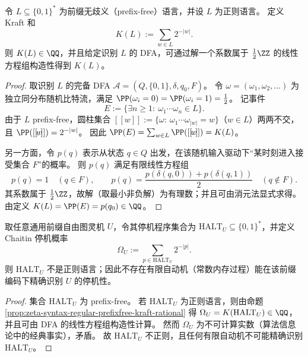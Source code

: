 \begin{proposition}\label{prop:zeta-syntax-regular-prefixfree-kraft-rational}
令 \(L\subseteq\{0,1\}^\ast\) 为前缀无歧义（prefix-free）语言，并设 \(L\) 为正则语言。
定义 Kraft 和
\[
K(L):=\sum_{w\in L}2^{-|w|}.
\]
则 \(K(L)\in\QQ\)，并且给定识别 \(L\) 的 DFA，可通过解一个系数属于 \(\tfrac12\ZZ\) 的线性方程组构造性得到 \(K(L)\)。
\end{proposition}
\begin{proof}
取识别 \(L\) 的完备 DFA \(\mathcal A=(Q,\{0,1\},\delta,q_0,F)\)。
令 \(\omega=(\omega_1,\omega_2,\dots)\) 为独立同分布随机比特流，满足 \(\PP(\omega_i=0)=\PP(\omega_i=1)=\tfrac12\)。
记事件
\[
E:=\{\exists n\ge 1:\ \omega_1\cdots\omega_n\in L\}.
\]
由于 \(L\) prefix-free，圆柱集合 \([[\!w\!]]:=\{\omega:\ \omega_1\cdots\omega_{|w|}=w\}\)（\(w\in L\)）两两不交，且 \(\PP([[\!w\!]])=2^{-|w|}\)。
因此 \(\PP(E)=\sum_{w\in L}\PP([[\!w\!]])=K(L)\)。
\par
另一方面，令 \(p(q)\) 表示从状态 \(q\in Q\) 出发，在该随机输入驱动下“某时刻进入接受集合 \(F\)”的概率。
则 \(p(q)\) 满足有限线性方程组
\[
p(q)=1\quad(q\in F),
\qquad
p(q)=\frac{p(\delta(q,0))+p(\delta(q,1))}{2}\quad(q\notin F).
\]
其系数属于 \(\tfrac12\ZZ\)，故解（取最小非负解）为有理数；并且可由消元法显式求得。
由定义 \(K(L)=\PP(E)=p(q_0)\in\QQ\)。
\end{proof}

\begin{theorem}[停机概率给出常数内存不可达的严格证据]\label{thm:zeta-syntax-omega-regular-impossible}
取任意通用前缀自由图灵机 \(U\)，令其停机程序集合为 \(\mathrm{HALT}_U\subseteq\{0,1\}^\ast\)，并定义 Chaitin 停机概率
\[
\Omega_U:=\sum_{p\in \mathrm{HALT}_U}2^{-|p|}.
\]
则 \(\mathrm{HALT}_U\) 不是正则语言；因此不存在有限自动机（常数内存过程）能在该前缀编码下精确识别 \(U\) 的停机性。
\end{theorem}
\begin{proof}
集合 \(\mathrm{HALT}_U\) 为 prefix-free。
若 \(\mathrm{HALT}_U\) 为正则语言，则由命题 \ref{prop:zeta-syntax-regular-prefixfree-kraft-rational} 得 \(\Omega_U=K(\mathrm{HALT}_U)\in\QQ\)，并且可由 DFA 的线性方程组构造性计算。
然而 \(\Omega_U\) 为不可计算实数（算法信息论中的经典事实），矛盾。
故 \(\mathrm{HALT}_U\) 不正则，且任何有限自动机不可能精确识别 \(\mathrm{HALT}_U\)。
\end{proof}

